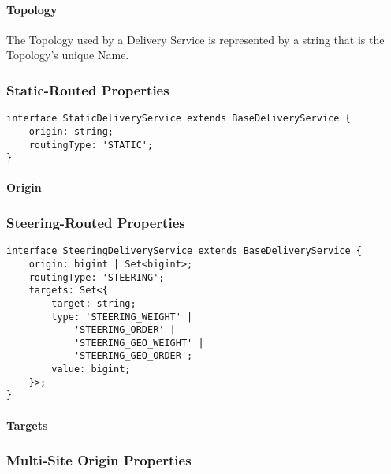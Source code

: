 \paragraph{Topology}
The Topology used by a Delivery Service is represented by a string that is the
Topology's unique Name.

\subsubsection{Static-Routed Properties}
\begin{codelisting}
\begin{verbatim}
interface StaticDeliveryService extends BaseDeliveryService {
	origin: string;
	routingType: 'STATIC';
}
\end{verbatim}
\end{codelisting}

\paragraph{Origin}

\subsubsection{Steering-Routed Properties}
\begin{codelisting}
\begin{verbatim}
interface SteeringDeliveryService extends BaseDeliveryService {
	origin: bigint | Set<bigint>;
	routingType: 'STEERING';
	targets: Set<{
		target: string;
		type: 'STEERING_WEIGHT' |
			'STEERING_ORDER' |
			'STEERING_GEO_WEIGHT' |
			'STEERING_GEO_ORDER';
		value: bigint;
	}>;
}
\end{verbatim}
\end{codelisting}

\paragraph{Targets}

\subsubsection{Multi-Site Origin Properties\label{sec:mso-props}}

